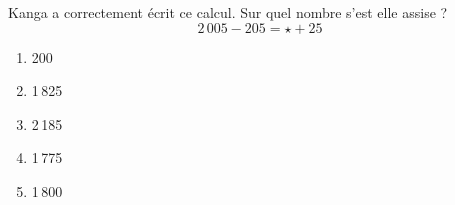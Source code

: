 Kanga a correctement écrit ce calcul. Sur quel nombre s'est elle assise ?
\[2\,005-205=\star+25\]
\begin{multicols}{5}
  \begin{enumerate}[A/]
    \item 200
    \item 1\,825
    \item 2\,185
    \item 1\,775
    \item 1\,800
  \end{enumerate}
\end{multicols}